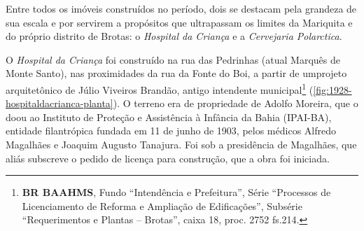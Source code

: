 Entre todos os imóveis construídos no período, dois se destacam pela grandeza de sua escala e por servirem a propósitos que ultrapassam os limites da Mariquita e do próprio distrito de Brotas: o \textit{Hospital da Criança} e a \textit{Cervejaria Polarctica}.

O \textit{Hospital da Criança} foi construído na rua das Pedrinhas (atual Marquês de Monte Santo), nas proximidades da rua da Fonte do Boi, a partir de umprojeto arquitetônico de Júlio Viveiros Brandão, antigo intendente municipal\footnote{\textbf{BR BAAHMS}, Fundo ``Intendência e Prefeitura'', Série ``Processos de Licenciamento de Reforma e Ampliação de Edificações'', Subsérie ``Requerimentos e Plantas -- Brotas'', caixa 18, proc. 2752 fs.214.} (\autoref{fig:1928-hospitaldacrianca-planta}). O terreno era de propriedade de Adolfo Moreira, que o doou ao Instituto de Proteção e Assistência à Infância da Bahia (IPAI-BA), entidade filantrópica fundada em 11 de junho de 1903, pelos médicos Alfredo Magalhães e Joaquim Augusto Tanajura. Foi sob a presidência de Magalhães, que aliás subscreve o pedido de licença para construção, que a obra foi iniciada. 



